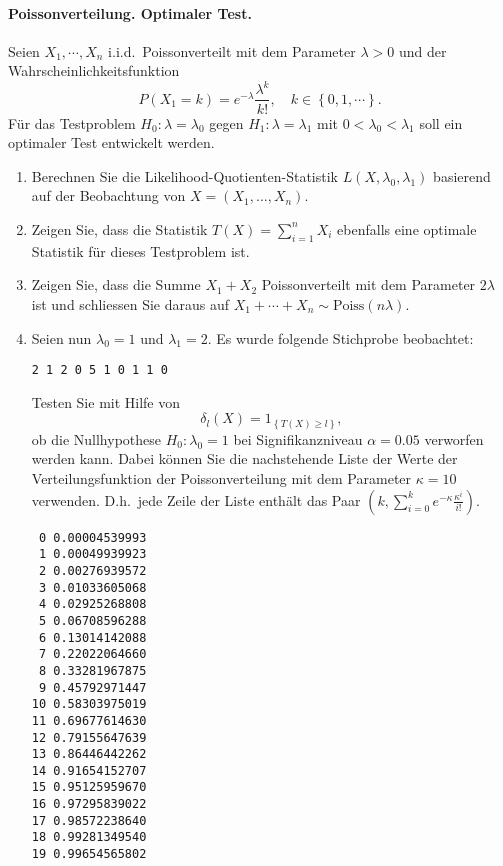 \paragraph{Poissonverteilung. Optimaler Test.} Seien $X_1, \cdots, X_n$ i.i.d.\
Poissonverteilt mit dem Parameter $\lambda>0$ und der Wahrscheinlichkeitsfunktion
\begin{equation*}
    P(X_1 = k) = e^{-\lambda} \frac{ \lambda^k}{k!}, \quad k \in \left\{ 0, 1, \cdots \right\}.
\end{equation*}
Für das Testproblem $H_0 : \lambda=\lambda_0$ gegen $H_1 : \lambda=\lambda_1$
mit $0<\lambda_0<\lambda_1$ soll ein optimaler Test entwickelt werden.
\begin{enumerate}
    \item Berechnen Sie die Likelihood-Quotienten-Statistik
        $L(X,\lambda_0,\lambda_1)$ basierend auf der Beobachtung von $X=\left(
        X_1,\ldots,X_n \right)$.
    \item Zeigen Sie, dass die Statistik $T(X)= \sum_{i=1}^{n} X_i$ ebenfalls
        eine optimale Statistik für dieses Testproblem ist.
    \item Zeigen Sie, dass die Summe $X_1+X_2$ Poissonverteilt mit dem
        Parameter $2 \lambda$ ist und schliessen Sie daraus auf $X_1 + \cdots +
        X_n \sim \text{Poiss}(n \lambda)$. 
    \item Seien nun $\lambda_0=1$ und $\lambda_1=2$. Es wurde folgende Stichprobe beobachtet:
        \begin{lstlisting}
2 1 2 0 5 1 0 1 1 0
        \end{lstlisting}
        Testen Sie mit Hilfe von 
        \begin{equation*}
            \delta_l(X) = 1_{   \left\{ T(X) \geq l \right\}},
        \end{equation*}
        ob die Nullhypothese $H_0 : \lambda_0=1$ bei Signifikanzniveau
        $\alpha=0.05$ verworfen werden kann. Dabei können Sie die nachstehende
        Liste der Werte der Verteilungsfunktion der Poissonverteilung mit dem
        Parameter $\kappa=10$ verwenden.  D.h.\ jede Zeile der Liste
        enthält das Paar  $\left( k, \sum_{i=0}^{k} e^{-\kappa}
        \frac{\kappa^{i}}{i!}\right)$.
\begin{lstlisting}
 0 0.00004539993
 1 0.00049939923
 2 0.00276939572
 3 0.01033605068
 4 0.02925268808
 5 0.06708596288
 6 0.13014142088
 7 0.22022064660
 8 0.33281967875
 9 0.45792971447
10 0.58303975019
11 0.69677614630
12 0.79155647639
13 0.86446442262
14 0.91654152707
15 0.95125959670
16 0.97295839022
17 0.98572238640
18 0.99281349540
19 0.99654565802
\end{lstlisting}
\end{enumerate}

